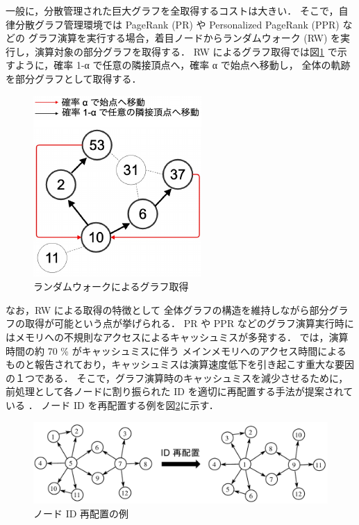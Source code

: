 一般に，分散管理された巨大グラフを全取得するコストは大きい．
そこで，自律分散グラフ管理環境では PageRank (PR) \cite{page1999pagerank} や Personalized PageRank (PPR) \cite{page1999pagerank} などの
グラフ演算を実行する場合，着目ノードからランダムウォーク (RW) を実行し，演算対象の部分グラフを取得する．
RW によるグラフ取得では図\ref{RW_graph} で示すように，確率 1-α で任意の隣接頂点へ，確率 α で始点へ移動し，
全体の軌跡を部分グラフとして取得する．
\begin{figure}[t]
  \centering
  \includegraphics[scale=2.0]{./figure/RW_graph.pdf}
  \caption{ランダムウォークによるグラフ取得}
  \label{RW_graph}
\end{figure}
なお，RW による取得の特徴として
全体グラフの構造を維持しながら部分グラフの取得が可能という点が挙げられる．
PR や PPR などのグラフ演算実行時にはメモリへの不規則なアクセスによるキャッシュミスが多発する．
\cite{wei2016speedup,zhang2017making} では，演算時間の約 70 \% がキャッシュミスに伴う
メインメモリへのアクセス時間によるものと報告されており，キャッシュミスは演算速度低下を引き起こす重大な要因の１つである．
そこで，グラフ演算時のキャッシュミスを減少させるために，
前処理として各ノードに割り振られた ID を適切に再配置する手法が提案されている \cite{wei2016speedup,zhang2017making,balaji2018graph,arai2016rabbit,lakhotia2017recall,faldu2019closer}．
ノード ID を再配置する例を図\ref{reordering_intro}に示す．
\begin{figure}[t]
  \centering
  \includegraphics[width=\linewidth]{./figure/reordering_intro.pdf}
  \caption{ノード ID 再配置の例}
  \label{reordering_intro}
\end{figure}
